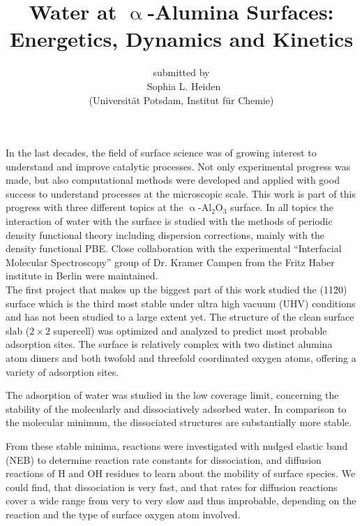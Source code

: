 \documentclass[11pt,DIV=13,a4paper,headinclude]{scrartcl}
\begin{document}
\titlehead{\centering\normalfont\large\scshape Scientific Abstract}
\title{\Large\vspace{-\baselineskip} Water at $\upalpha$-Alumina Surfaces:\\
  Energetics, Dynamics and Kinetics\vspace{0\baselineskip}}
\author{\large\sffamily submitted by\\
  \Large\textbf\sffamily\ Sophia L. Heiden\\
  \large\sffamily (Universit\"{a}t Potsdam, Institut f\"{u}r Chemie)}
\date{}

\maketitle

In the last decades, the field of surface science was of growing interest to understand and improve catalytic processes.
Not only experimental progress was made, but also computational methods were developed and applied with good success to understand processes at the microscopic scale.
This work is part of this progress with three different topics at the $\upalpha$-Al$_2$O$_3$ surface.
In all topics the interaction of water with the surface is studied with the methods of periodic density functional theory including dispersion corrections, mainly with the density functional PBE.
Close collaboration with the experimental ``Interfacial Molecular Spectroscopy'' group of Dr. Kramer Campen from the Fritz Haber institute in Berlin were maintained.
\\


The first project that makes up the biggest part of this work studied the (11\=20) surface which is the third most stable under ultra high vacuum (UHV) conditions and has not been studied to a large extent yet.
The structure of the clean surface slab ($2\times 2$ supercell) was optimized and analyzed to predict most probable adsorption sites.
The surface is relatively complex with two distinct alumina atom dimers and both twofold and threefold coordinated oxygen atoms, offering a variety of adsorption sites.

The adsorption of water was studied in the low coverage limit, concerning the stability of the molecularly and dissociatively adsorbed water.
In comparison to the molecular minimum, the dissociated structures are substantially more stable.

From these stable minima, reactions were investigated with nudged elastic band (NEB) to determine reaction rate constants for dissociation, and diffusion reactions of H and OH residues to learn about the mobility of surface species.
We could find, that dissociation is very fast, and that rates for diffusion reactions cover a wide range from very to very slow and thus improbable, depending on the reaction and the type of surface oxygen atom involved. 
\end{document}
